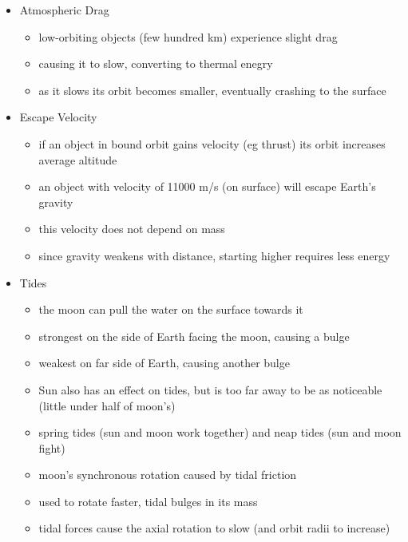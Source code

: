 \begin{itemize}
\item Atmospheric Drag
\begin{itemize}
\item low-orbiting objects (few hundred km) experience slight drag
\item causing it to slow, converting to thermal enegry
\item as it slows its orbit becomes smaller, eventually crashing to the surface
\end{itemize}
\item Escape Velocity
\begin{itemize}
\item if an object in bound orbit gains velocity (eg thrust) its orbit increases average altitude
\item an object with velocity of 11000 m/s (on surface) will escape Earth's gravity
\item this velocity does not depend on mass
\item since gravity weakens with distance, starting higher requires less energy
\end{itemize}
\item Tides
\begin{itemize}
\item the moon can pull the water on the surface towards it
\item strongest on the side of Earth facing the moon, causing a bulge
\item weakest on far side of Earth, causing another bulge
\item Sun also has an effect on tides, but is too far away to be as noticeable (little under half of moon's)
\item spring tides (sun and moon work together) and neap tides (sun and moon fight)
\item moon's synchronous rotation caused by tidal friction
\item used to rotate faster, tidal bulges in its mass
\item tidal forces cause the axial rotation to slow (and orbit radii to increase)
\end{itemize}
\end{itemize}
